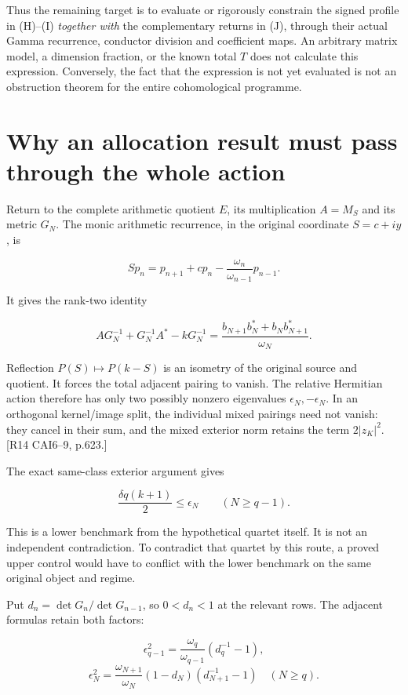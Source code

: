 Thus the remaining target is to evaluate or rigorously constrain the signed profile in (H)--(I) \emph{together with} the complementary returns in (J), through their actual Gamma recurrence, conductor division and coefficient maps. An arbitrary matrix model, a dimension fraction, or the known total \(T\) does not calculate this expression. Conversely, the fact that the expression is not yet evaluated is not an obstruction theorem for the entire cohomological programme.

\section{Why an allocation result must pass through the whole action}\label{why-an-allocation-result-must-pass-through-the-whole-action}

Return to the complete arithmetic quotient \(E\), its multiplication \(A=M_S\) and its metric \(G_N\). The monic arithmetic recurrence, in the original coordinate \(S=c+iy\), is

\[
Sp_n=p_{n+1}+cp_n-\frac{\omega_n}{\omega_{n-1}}p_{n-1}.
\]

It gives the rank-two identity

\[
AG_N^{-1}+G_N^{-1}A^*-kG_N^{-1}
=\frac{b_{N+1}b_N^*+b_Nb_{N+1}^*}{\omega_N}.
\]

Reflection \(P(S)\mapsto P(k-S)\) is an isometry of the original source and quotient. It forces the total adjacent pairing to vanish. The relative Hermitian action therefore has only two possibly nonzero eigenvalues \(\epsilon_N,-\epsilon_N\). In an orthogonal kernel/image split, the individual mixed pairings need not vanish: they cancel in their sum, and the mixed exterior norm retains the term \(2|z_K|^2\). {[}R14 CAI6--9, p.623.{]}

The exact same-class exterior argument gives

\[
\frac{\delta q(k+1)}2\le\epsilon_N\qquad(N\ge q-1).
\tag{K}
\]

This is a lower benchmark from the hypothetical quartet itself. It is not an independent contradiction. To contradict that quartet by this route, a proved upper control would have to conflict with the lower benchmark on the same original object and regime.

Put \(d_n=\det G_n/\det G_{n-1}\), so \(0<d_n<1\) at the relevant rows. The adjacent formulas retain both factors:

\[
\epsilon_{q-1}^2=\frac{\omega_q}{\omega_{q-1}}(d_q^{-1}-1),
\] \[
\epsilon_N^2=\frac{\omega_{N+1}}{\omega_N}
           (1-d_N)(d_{N+1}^{-1}-1)\quad(N\ge q).
\]

